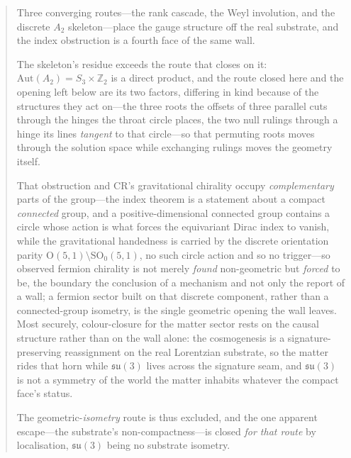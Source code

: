 \documentclass[11pt]{article}
\theoremstyle{plain}
\theoremstyle{remark}
\newcommand{\su}{\mathfrak{su}}
\begin{document}
\begin{abstract}
Three converging routes---the rank cascade, the Weyl involution, and the discrete $A_2$ skeleton---place the gauge structure off the real substrate, and the index obstruction is a fourth face of the same wall. 

The skeleton's residue exceeds the route that closes on it: $\mathrm{Aut}(A_2)=S_3\times\mathbb{Z}_2$ is a direct product, and the route closed here and the opening left below are its two factors, differing in kind because of the structures they act on---the three roots the offsets of three parallel cuts through the hinges the throat circle places, the two null rulings through a hinge its lines \emph{tangent} to that circle---so that permuting roots moves through the solution space while exchanging rulings moves the geometry itself. 

That obstruction and CR's gravitational chirality occupy \emph{complementary} parts of the group---the index theorem is a statement about a compact \emph{connected} group, and a positive-dimensional connected group contains a circle whose action is what forces the equivariant Dirac index to vanish, while the gravitational handedness is carried by the discrete orientation parity $\mathrm{O}(5,1)\setminus\mathrm{SO}_0(5,1)$, no such circle action and so no trigger---so observed fermion chirality is not merely \emph{found} non-geometric but \emph{forced} to be, the boundary the conclusion of a mechanism and not only the report of a wall; a fermion sector built on that discrete component, rather than a connected-group isometry, is the single geometric opening the wall leaves. Most securely, colour-closure for the matter sector rests on the causal structure rather than on the wall alone: the cosmogenesis is a signature-preserving reassignment on the real Lorentzian substrate, so the matter rides that horn while $\su(3)$ lives across the signature seam, and $\su(3)$ is not a symmetry of the world the matter inhabits whatever the compact face's status. 

The geometric-\emph{isometry} route is thus excluded, and the one apparent escape---the substrate's non-compactness---is closed \emph{for that route} by localisation, $\su(3)$ being no substrate isometry. 


\end{abstract}
\end{document}
